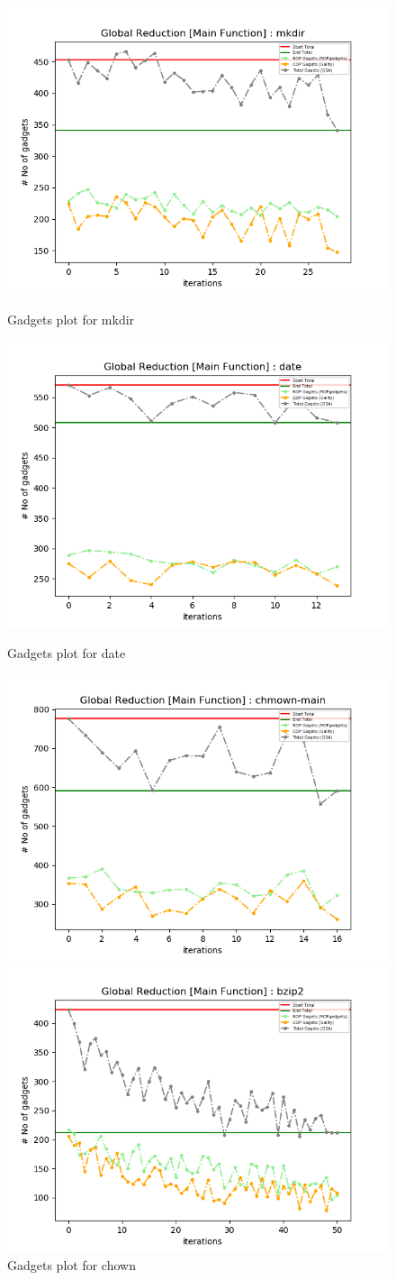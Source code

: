 \documentclass{relatorio}
\begin{document}
\begin{figure}[H]
	\centering
	\captionsetup{justification=centering}
	\includegraphics[width=0.65\linewidth]{imgs/chisel_gadgets_mkdir_plot.png}
	\caption{Gadgets plot for \color{blue} mkdir}%
	\label{fig:plant}
	\centering
	\captionsetup{justification=centering}
	\includegraphics[width=0.65\linewidth]{imgs/chisel_gadgets_date_plot.png}
	\caption{Gadgets plot for \color{blue} date}%
	\label{fig:plant}
	\centering
	\captionsetup{justification=centering}
	\includegraphics[width=0.65\linewidth]{imgs/chisel_gadgets_chmown-main_plot.png}
	\caption{Gadgets plot for \color{blue} chown}%
	\label{fig:plant}
	\centering
	\captionsetup{justification=centering}
	\includegraphics[width=0.65\linewidth]{imgs/chisel_gadgets_bzip2_plot.png}

\end{figure}
\end{document}

